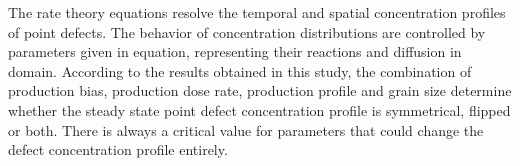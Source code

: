 \documentclass[a4paper]{article}
\begin{document}
The rate theory equations resolve the temporal and spatial concentration profiles of point defects. The behavior of concentration distributions are controlled by parameters given in equation, representing their reactions and diffusion in domain. According to the results obtained in this study, the combination of production bias, production dose rate, production profile and grain size determine whether the steady state point defect concentration profile is symmetrical, flipped or both. There is always a critical value for parameters that could change the defect concentration profile entirely.



\end{document}
